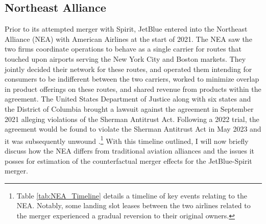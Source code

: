\documentclass{article}
\begin{document}

    	
	\subsection{Northeast Alliance}
	\label{sec:Setting_NEA}
	
	Prior to its attempted merger with Spirit, JetBlue entered into the Northeast Alliance (NEA) with American Airlines at the start of 2021. The NEA saw the two firms coordinate operations to behave as a single carrier for routes that touched upon airports serving the New York City and Boston markets. They jointly decided their network for these routes, and operated them intending for consumers to be indifferent between the two carriers, worked to minimize overlap in product offerings on these routes, and shared revenue from products within the agreement. The United States Department of Justice along with six states and the District of Columbia brought a lawsuit against the agreement in September 2021 alleging violations of the Sherman Antitrust Act. Following a 2022 trial, the agreement would be found to violate the Sherman Antitrust Act in May 2023 and it was subsequently unwound \citep{rennison_jetblue-american_2023, rains_what_2023}.\footnote{Table \ref{tab:NEA_Timeline} details a timeline of key events relating to the NEA. Notably, some landing slot leases between the two airlines related to the merger experienced a gradual reversion to their original owners.} With this timeline outlined, I will now briefly discuss how the NEA differs from traditional aviation alliances and the issues it posses for estimation of the counterfactual merger effects for the JetBlue-Spirit merger. 
\end{document}
